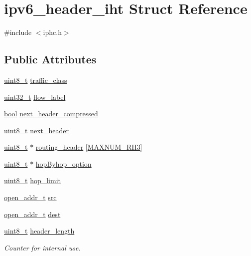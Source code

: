 \hypertarget{structipv6__header__iht}{}\section{ipv6\+\_\+header\+\_\+iht Struct Reference}
\label{structipv6__header__iht}


{\ttfamily \#include $<$iphc.\+h$>$}

\subsection*{Public Attributes}
\begin{DoxyCompactItemize}
\item 
\hyperlink{_p_e___types_8h_aba7bc1797add20fe3efdf37ced1182c5}{uint8\+\_\+t} \hyperlink{structipv6__header__iht_a4f95e94a16a1fe4432cd085c8a853460}{traffic\+\_\+class}
\item 
\hyperlink{_p_e___types_8h_a33594304e786b158f3fb30289278f5af}{uint32\+\_\+t} \hyperlink{structipv6__header__iht_a096db90d3dac8fc8ad84647c7f7ad569}{flow\+\_\+label}
\item 
\hyperlink{_p_e___types_8h_a97a80ca1602ebf2303258971a2c938e2}{bool} \hyperlink{structipv6__header__iht_afa37d6d6b4cd2317e9ea631413f4d7af}{next\+\_\+header\+\_\+compressed}
\item 
\hyperlink{_p_e___types_8h_aba7bc1797add20fe3efdf37ced1182c5}{uint8\+\_\+t} \hyperlink{structipv6__header__iht_af41175a4162c4ad3bd3948be2b21df56}{next\+\_\+header}
\item 
\hyperlink{_p_e___types_8h_aba7bc1797add20fe3efdf37ced1182c5}{uint8\+\_\+t} $\ast$ \hyperlink{structipv6__header__iht_a5b9de4d76a74c92aabf1c0fae933166a}{routing\+\_\+header} \mbox{[}\hyperlink{group___i_p_h_c_ga4ec48eab341b4cbcbc00238435f650e2}{M\+A\+X\+N\+U\+M\+\_\+\+R\+H3}\mbox{]}
\item 
\hyperlink{_p_e___types_8h_aba7bc1797add20fe3efdf37ced1182c5}{uint8\+\_\+t} $\ast$ \hyperlink{structipv6__header__iht_a8bc0b0fe214777daf385e87f5ebc3c18}{hop\+Byhop\+\_\+option}
\item 
\hyperlink{_p_e___types_8h_aba7bc1797add20fe3efdf37ced1182c5}{uint8\+\_\+t} \hyperlink{structipv6__header__iht_a6a1ad31bf1db45f8ca1f087309984f57}{hop\+\_\+limit}
\item 
\hyperlink{structopen__addr__t}{open\+\_\+addr\+\_\+t} \hyperlink{structipv6__header__iht_a09de10b33e8ee4f4484d8818543296ee}{src}
\item 
\hyperlink{structopen__addr__t}{open\+\_\+addr\+\_\+t} \hyperlink{structipv6__header__iht_ac555658b79373c595910859b873c4db3}{dest}
\item 
\hyperlink{_p_e___types_8h_aba7bc1797add20fe3efdf37ced1182c5}{uint8\+\_\+t} \hyperlink{structipv6__header__iht_a134cf93f9a622bef68ddb915538a594e}{header\+\_\+length}
\begin{DoxyCompactList}\small\item\em Counter for internal use. \end{DoxyCompactList}\end{DoxyCompactItemize}


